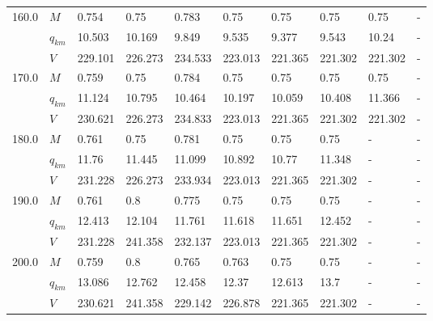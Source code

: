 \begin{tabular}{|l|l|llllllll|}
\hline
160.0 & $M$ &    0.754 &     0.75 &    0.783 &                      0.75 &     0.75\cellcolor{green} &                      0.75 &     0.75 &        - \\
      & $q_{km}$ &   10.503 &   10.169 &    9.849 &                     9.535 &    9.377\cellcolor{green} &                     9.543 &    10.24 &        - \\
      & $V$ &  229.101 &  226.273 &  234.533 &                   223.013 &  221.365\cellcolor{green} &                   221.302 &  221.302 &        - \\
\hline
170.0 & $M$ &    0.759 &     0.75 &    0.784 &                      0.75 &     0.75\cellcolor{green} &                      0.75 &     0.75 &        - \\
      & $q_{km}$ &   11.124 &   10.795 &   10.464 &                    10.197 &   10.059\cellcolor{green} &                    10.408 &   11.366 &        - \\
      & $V$ &  230.621 &  226.273 &  234.833 &                   223.013 &  221.365\cellcolor{green} &                   221.302 &  221.302 &        - \\
\hline
180.0 & $M$ &    0.761 &     0.75 &    0.781 &                      0.75 &     0.75\cellcolor{green} &                      0.75 &        - &        - \\
      & $q_{km}$ &    11.76 &   11.445 &   11.099 &                    10.892 &    10.77\cellcolor{green} &                    11.348 &        - &        - \\
      & $V$ &  231.228 &  226.273 &  233.934 &                   223.013 &  221.365\cellcolor{green} &                   221.302 &        - &        - \\
\hline
190.0 & $M$ &    0.761 &      0.8 &    0.775 &     0.75\cellcolor{green} &                      0.75 &                      0.75 &        - &        - \\
      & $q_{km}$ &   12.413 &   12.104 &   11.761 &   11.618\cellcolor{green} &                    11.651 &                    12.452 &        - &        - \\
      & $V$ &  231.228 &  241.358 &  232.137 &  223.013\cellcolor{green} &                   221.365 &                   221.302 &        - &        - \\
\hline
200.0 & $M$ &    0.759 &      0.8 &    0.765 &    0.763\cellcolor{green} &                      0.75 &                      0.75 &        - &        - \\
      & $q_{km}$ &   13.086 &   12.762 &   12.458 &    12.37\cellcolor{green} &                    12.613 &                      13.7 &        - &        - \\
      & $V$ &  230.621 &  241.358 &  229.142 &  226.878\cellcolor{green} &                   221.365 &                   221.302 &        - &        - \\
\hline
\end{tabular}
